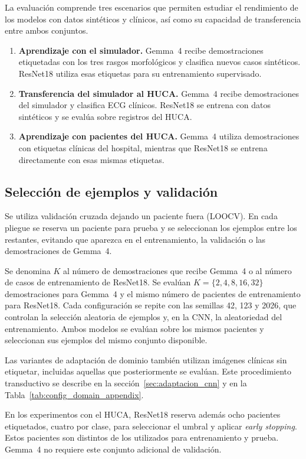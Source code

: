 La evaluación comprende tres escenarios que permiten estudiar el rendimiento de los modelos con datos sintéticos y clínicos, así como su capacidad de transferencia entre ambos conjuntos.

\begin{enumerate}
  \item \textbf{Aprendizaje con el simulador.} Gemma~4 recibe demostraciones etiquetadas con los tres rasgos morfológicos y clasifica nuevos casos sintéticos. ResNet18 utiliza esas etiquetas para su entrenamiento supervisado.
  \item \textbf{Transferencia del simulador al HUCA.} Gemma~4 recibe demostraciones del simulador y clasifica ECG clínicos. ResNet18 se entrena con datos sintéticos y se evalúa sobre registros del HUCA.
  \item \textbf{Aprendizaje con pacientes del HUCA.} Gemma~4 utiliza demostraciones con etiquetas clínicas del hospital, mientras que ResNet18 se entrena directamente con esas mismas etiquetas.
\end{enumerate}

\subsection{Selección de ejemplos y validación}
\label{sec:validacion_comun}

Se utiliza validación cruzada dejando un paciente fuera (LOOCV). En cada pliegue se reserva un paciente para prueba y se seleccionan los ejemplos entre los restantes, evitando que aparezca en el entrenamiento, la validación o las demostraciones de Gemma~4.

Se denomina \(K\) al número de demostraciones que recibe Gemma~4 o al número de casos de entrenamiento de ResNet18. Se evalúan \(K=\{2,4,8,16,32\}\) demostraciones para Gemma~4 y el mismo número de pacientes de entrenamiento para ResNet18. Cada configuración se repite con las semillas 42, 123 y 2026, que controlan la selección aleatoria de ejemplos y, en la CNN, la aleatoriedad del entrenamiento. Ambos modelos se evalúan sobre los mismos pacientes y seleccionan sus ejemplos del mismo conjunto disponible.

Las variantes de adaptación de dominio también utilizan imágenes clínicas sin etiquetar, incluidas aquellas que posteriormente se evalúan. Este procedimiento transductivo se describe en la sección~\ref{sec:adaptacion_cnn} y en la Tabla~\ref{tab:config_domain_appendix}.

En los experimentos con el HUCA, ResNet18 reserva además ocho pacientes etiquetados, cuatro por clase, para seleccionar el umbral y aplicar \textit{early stopping}. Estos pacientes son distintos de los utilizados para entrenamiento y prueba. Gemma~4 no requiere este conjunto adicional de validación.

